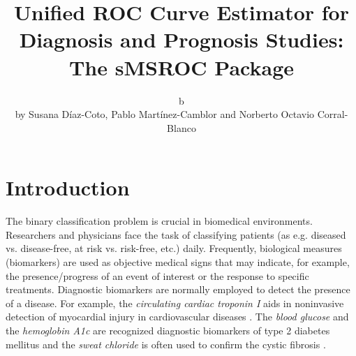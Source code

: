 \title {Unified ROC Curve Estimator for Diagnosis and Prognosis Studies: The sMSROC Package}
\author{\phantom b\par\noindent by Susana D\'iaz-Coto, Pablo Mart\'inez-Camblor and Norberto Octavio Corral-Blanco}

\maketitle


\section{Introduction} \label{sec:s1}
The binary classification problem is crucial in biomedical environments. Researchers and physicians face the task of classifying patients (as e.g. diseased vs. disease-free, at risk vs. risk-free, etc.) daily. Frequently, biological measures (biomarkers) are used as objective medical signs that may indicate, for example, the presence/progress of an event of interest or the response to specific treatments.
Diagnostic biomarkers are normally employed to detect the presence of a disease. For example, the \textit{circulating cardiac troponin I} aids in noninvasive detection of myocardial injury in cardiovascular diseases \citep{Ni2018}. The \textit{blood glucose} and the \textit{hemoglobin A1c} are recognized diagnostic biomarkers of type 2 diabetes mellitus \citep{Long2020} and the \textit{sweat chloride} is often used to confirm the cystic fibrosis \citep{Farrel2008}.

